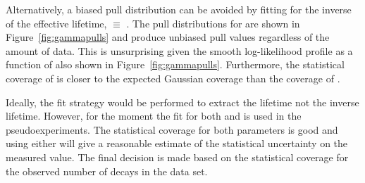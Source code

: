 {Alternatively, a biased pull distribution can be avoided by fitting for the inverse of the effective lifetime, \invtmumu$ \equiv$ \Gmumu. The pull distributions for \Gmumu are shown in Figure~\ref{fig:gammapulls} and produce unbiased pull values regardless of the amount of data. This is unsurprising given the smooth log-likelihood profile as a function of \Gmumu also shown in Figure~\ref{fig:gammapulls}. Furthermore, the statistical coverage of \Gmumu is closer to the expected Gaussian coverage than the coverage of \tmumu.  %


Ideally, the fit strategy would be performed to extract the lifetime not the inverse lifetime. However, for the moment the fit for both \tmumu and \Gmumu is used in the pseudoexperiments. The statistical coverage for both parameters is good and using either will give a reasonable estimate of the statistical uncertainty on the measured value. The final decision is made based on the statistical coverage for the observed number of decays in the data set. 



}
